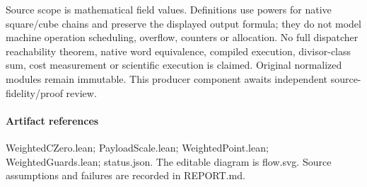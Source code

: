 \documentclass[11pt]{article}
\begin{document}
Source scope is mathematical field values. Definitions use powers for native square/cube chains and preserve the displayed output formula; they do not model machine operation scheduling, overflow, counters or allocation. No full dispatcher reachability theorem, native word equivalence, compiled execution, divisor-class sum, cost measurement or scientific execution is claimed. Original normalized modules remain immutable. This producer component awaits independent source-fidelity/proof review.\par\medskip
\paragraph{Artifact references} WeightedCZero.lean; PayloadScale.lean; WeightedPoint.lean; WeightedGuards.lean; status.json. The editable diagram is flow.svg. Source assumptions and failures are recorded in REPORT.md.
\end{document}
